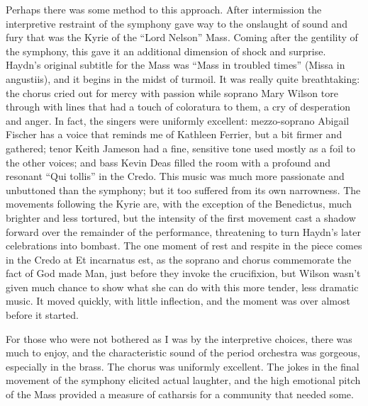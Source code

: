 Perhaps there was some method to this approach. After intermission the interpretive restraint of the symphony gave way to the onslaught of sound and fury that was the Kyrie of the “Lord Nelson” Mass. Coming after the gentility of the symphony, this gave it an additional dimension of shock and surprise. Haydn’s original subtitle for the Mass was “Mass in troubled times” (Missa in angustiis), and it begins in the midst of turmoil. It was really quite breathtaking: the chorus cried out for mercy with passion while soprano Mary Wilson tore through with lines that had a touch of coloratura to them, a cry of desperation and anger. In fact, the singers were uniformly excellent: mezzo-soprano Abigail Fischer has a voice that reminds me of Kathleen Ferrier, but a bit firmer and gathered; tenor Keith Jameson had a fine, sensitive tone used mostly as a foil to the other voices; and bass Kevin Deas filled the room with a profound and resonant “Qui tollis” in the Credo. This music was much more passionate and unbuttoned than the symphony; but it too suffered from its own narrowness. The movements following the Kyrie are, with the exception of the Benedictus, much brighter and less tortured, but the intensity of the first movement cast a shadow forward over the remainder of the performance, threatening to turn Haydn's later celebrations into bombast. The one moment of rest and respite in the piece comes in the Credo at Et incarnatus est, as the soprano and chorus commemorate the fact of God made Man, just before they invoke the crucifixion, but Wilson wasn't given much chance to show what she can do with this more tender, less dramatic music. It moved quickly, with little inflection, and the moment was over almost before it started.

For those who were not bothered as I was by the interpretive choices, there was much to enjoy, and the characteristic sound of the period orchestra was gorgeous, especially in the brass. The chorus was uniformly excellent. The jokes in the final movement of the symphony elicited actual laughter, and the high emotional pitch of the Mass provided a measure of catharsis for a community that needed some.
